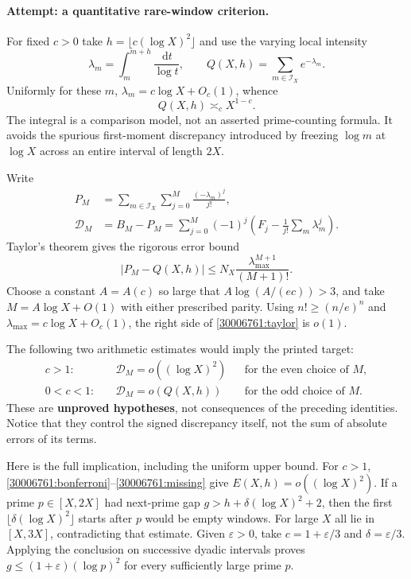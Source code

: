 \documentclass[11pt,a4paper]{article}
\newcommand{\dd}{\,\mathrm d}
\numberwithin{equation}{section}
\begin{document}
\paragraph{Attempt: a quantitative rare-window criterion.}
For fixed $c>0$ take $h=\lfloor c(\log X)^2\rfloor$ and use the varying
local intensity
\[
 \lambda_m=\int_m^{m+h}\frac{\dd t}{\log t},\qquad
 Q(X,h)=\sum_{m\in\mathcal I_X}e^{-\lambda_m}.
\]
Uniformly for these $m$,
$\lambda_m=c\log X+O_c(1)$, whence
\begin{equation}\label{30006761:poisson-scale}
 Q(X,h)\asymp_c X^{1-c}.
\end{equation}
The integral is a comparison model, not an asserted prime-counting formula.
It avoids the spurious first-moment discrepancy introduced by freezing
$\log m$ at $\log X$ across an entire interval of length $2X$.

Write
\begin{align}
 P_M&=\sum_{m\in\mathcal I_X}\sum_{j=0}^M
             \frac{(-\lambda_m)^j}{j!},\\
 \mathcal D_M&=B_M-P_M
 =\sum_{j=0}^M(-1)^j
   \left(F_j-\frac1{j!}\sum_m\lambda_m^j\right).
 \label{30006761:signed-discrepancy}
\end{align}
Taylor's theorem gives the rigorous error bound
\begin{equation}\label{30006761:taylor}
 |P_M-Q(X,h)|\le
 N_X\frac{\lambda_{\max}^{M+1}}{(M+1)!}.
\end{equation}
Choose a constant $A=A(c)$ so large that
$A\log(A/(ec))>3$, and take $M=A\log X+O(1)$ with either prescribed
parity. Using $n!\ge(n/e)^n$ and
$\lambda_{\max}=c\log X+O_c(1)$, the right side of
\eqref{30006761:taylor} is $o(1)$.

The following two arithmetic estimates would imply the printed target:
\begin{equation}\label{30006761:missing}
 \begin{aligned}
 c>1:&\quad \mathcal D_M=o((\log X)^2)
       &&\text{for the even choice of }M,\\
 0<c<1:&\quad \mathcal D_M=o(Q(X,h))
       &&\text{for the odd choice of }M.
 \end{aligned}
\end{equation}
These are \textbf{unproved hypotheses}, not consequences of the preceding
identities. Notice that they control the signed discrepancy itself, not
the sum of absolute errors of its terms.

Here is the full implication, including the uniform upper bound. For
$c>1$, \eqref{30006761:bonferroni}--\eqref{30006761:missing} give
$E(X,h)=o((\log X)^2)$. If a prime $p\in[X,2X]$ had next-prime gap
$g>h+\delta(\log X)^2+2$, then the first
$\lfloor\delta(\log X)^2\rfloor$ starts after $p$ would be empty windows.
For large $X$ all lie in $[X,3X]$, contradicting that estimate. Given
$\varepsilon>0$, take $c=1+\varepsilon/3$ and
$\delta=\varepsilon/3$. Applying the conclusion on successive dyadic
intervals proves $g\le(1+\varepsilon)(\log p)^2$ for every sufficiently
large prime $p$.
\end{document}

